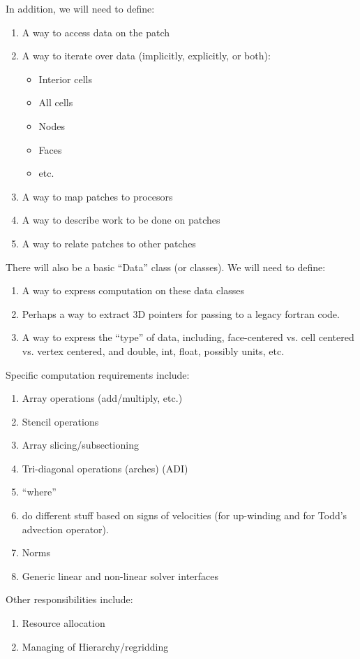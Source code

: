 In addition, we will need to define:
\begin{enumerate}
\item A way to access data on the patch
\item A way to iterate over data (implicitly, explicitly, or both):
\begin{itemize}
\item Interior cells
\item All cells
\item Nodes
\item Faces
\item etc.
\end{itemize}
\item A way to map patches to procesors
\item A way to describe work to be done on patches
\item A way to relate patches to other patches
\end{enumerate}

\vspace{1.5in}

There will also be a basic ``Data'' class (or classes).  We will need
to define:
\begin{enumerate}
\item A way to express computation on these data classes
\item Perhaps a way to extract 3D pointers for passing to a legacy
      fortran code.
\item A way to express the ``type'' of data, including, face-centered
      vs. cell centered vs. vertex centered, and double, int, float,
      possibly units, etc.
\end{enumerate}

Specific computation requirements include:
\begin{enumerate}
\item Array operations (add/multiply, etc.)
\item Stencil operations
\item Array slicing/subsectioning
\item Tri-diagonal operations (arches) (ADI)
\item ``where''
\item do different stuff based on signs of velocities (for up-winding
      and for Todd's advection operator).
\item Norms
\item Generic linear and non-linear solver interfaces
\end{enumerate}

\vspace{1.5in}

Other responsibilities include:
\begin{enumerate}
\item Resource allocation
\item Managing of Hierarchy/regridding
\end{enumerate}
